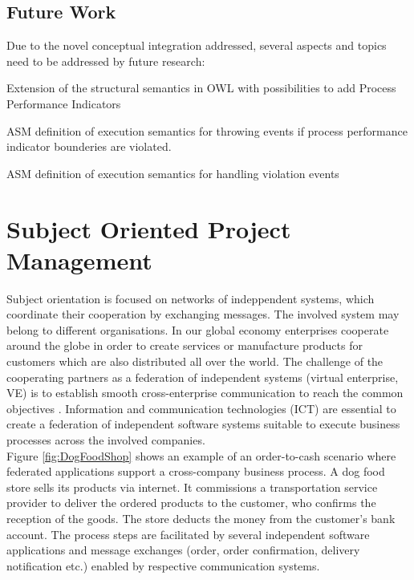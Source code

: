 \subsection{Future Work}

Due to the novel conceptual integration addressed, several aspects and topics need to be addressed by future research:
\begin{list}{-}{spacing}
	\item Extension of the structural semantics in OWL with possibilities to add Process Performance Indicators
	\item ASM definition of execution semantics for throwing events if process performance indicator bounderies are violated.
	\item ASM definition of execution semantics for handling violation events 
\end{list}
 

\section{Subject Oriented Project Management}

Subject orientation is focused on networks of indeppendent systems, which coordinate their cooperation by exchanging messages. The involved system may belong to different organisations.
In our global economy enterprises cooperate around the globe in order to create services or manufacture products for customers which are also distributed all over the world. The challenge of the cooperating partners as a federation of independent systems (virtual enterprise, VE) is to establish smooth cross-enterprise communication to reach the common objectives \cite{article:VirtualEnterprise}. Information and communication technologies (ICT) are essential to create a federation of independent software systems suitable to execute business processes across the involved companies. 
\\
Figure \ref{fig:DogFoodShop} shows an example of an order-to-cash scenario where federated applications support a cross-company business process. A dog food store sells its products via internet. It commissions a transportation service provider to deliver the ordered products to the customer, who confirms the reception of the goods. The store deducts the money from the customer's bank account. The process steps are facilitated by several independent software applications and message exchanges (order, order confirmation, delivery notification etc.) enabled by respective communication systems.


